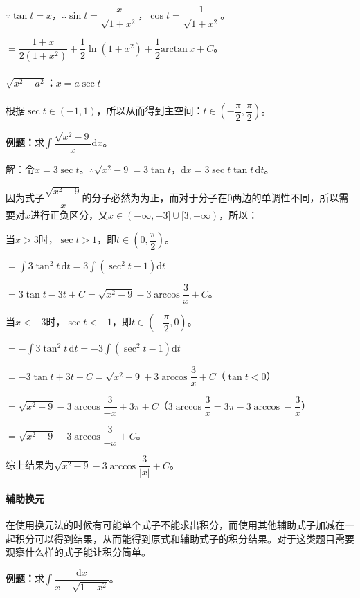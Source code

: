 \documentclass[UTF8, 12pt]{ctexart}
\begin{document}
$\because\tan t=x$，$\therefore\sin t=\dfrac{x}{\sqrt{1+x^2}}$，$\cos t=\dfrac{1}{\sqrt{1+x^2}}$。

$=\dfrac{1+x}{2(1+x^2)}+\dfrac{1}{2}\ln(1+x^2)+\dfrac{1}{2}\textrm{arctan}\,x+C$。

\paragraph{\texorpdfstring{$\sqrt{x^2-a^2}$：$x=a\sec t$}\ } \leavevmode \medskip

根据$\sec t\in(-1,1)$，所以从而得到主空间：$t\in\left(-\dfrac{\pi}{2},\dfrac{\pi}{2}\right)$。\medskip

\textbf{例题：}求$\displaystyle{\int\dfrac{\sqrt{x^2-9}}{x}\textrm{d}x}$。

解：令$x=3\sec t$。$\therefore\sqrt{x^2-9}=3\tan t$，$\textrm{d}x=3\sec t\tan t\,\textrm{d}t$。\medskip

因为式子$\dfrac{\sqrt{x^2-9}}{x}$的分子必然为为正，而对于分子在0两边的单调性不同，所以需要对$x$进行正负区分，又$x\in(-\infty,-3]\cup[3,+\infty)$，所以：

当$x>3$时，$\sec t>1$，即$t\in\left(0,\dfrac{\pi}{2}\right)$。

$=\displaystyle{\int3\tan^2t\,\textrm{d}t=3\int(\sec^2t-1)\textrm{d}t}$

$=3\tan t-3t+C=\sqrt{x^2-9}-3\arccos\dfrac{3}{x}+C$。

当$x<-3$时，$\sec t<-1$，即$t\in\left(-\dfrac{\pi}{2},0\right)$。

$=\displaystyle{-\int3\tan^2t\,\textrm{d}t=-3\int(\sec^2t-1)\textrm{d}t}$

$=-3\tan t+3t+C=\sqrt{x^2-9}+3\arccos\dfrac{3}{x}+C$（$\tan t<0$）

$=\sqrt{x^2-9}-3\arccos\dfrac{3}{-x}+3\pi+C$（$3\arccos\dfrac{3}{x}=3\pi-3\arccos-\dfrac{3}{x}$）

$=\sqrt{x^2-9}-3\arccos\dfrac{3}{-x}+C$。

综上结果为$\sqrt{x^2-9}-3\arccos\dfrac{3}{\vert x\vert}+C$。

\paragraph{辅助换元} \leavevmode \medskip

在使用换元法的时候有可能单个式子不能求出积分，而使用其他辅助式子加减在一起积分可以得到结果，从而能得到原式和辅助式子的积分结果。对于这类题目需要观察什么样的式子能让积分简单。

\textbf{例题：}求$\displaystyle{\int\dfrac{\textrm{d}x}{x+\sqrt{1-x^2}}}$。\medskip
\end{document}
